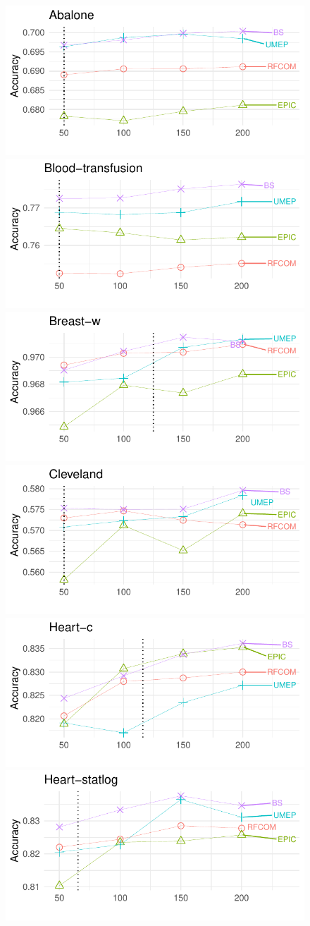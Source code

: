 



\begin{figure}[!ht]
\begin{center}\scriptsize
\includegraphics[width=.494\textwidth]{5_Guided_Search/fig/S-ENS-Abalone.pdf}
\includegraphics[width=.494\textwidth]{5_Guided_Search/fig/S-ENS-Blood-transfusion.pdf}\\
\includegraphics[width=.494\textwidth]{5_Guided_Search/fig/S-ENS-Breast-w.pdf} 
\includegraphics[width=.494\textwidth]{5_Guided_Search/fig/S-ENS-Cleveland.pdf}\\
\includegraphics[width=.494\textwidth]{5_Guided_Search/fig/S-ENS-Heart-c.pdf}
\includegraphics[width=.494\textwidth]{5_Guided_Search/fig/S-ENS-Heart-statlog.pdf}\\

\end{center}
\end{figure}
